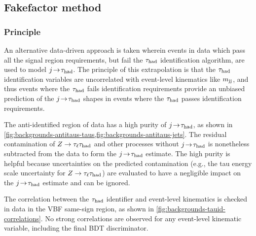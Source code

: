 \subsection{Fakefactor method}

\subsubsection{Principle}

An alternative data-driven approach is taken wherein events in data which pass all the signal region requirements, but fail the $\tau_\text{had}$ identification algorithm, are used to model $j\!\rightarrow\!\tau_\text{had}$. The principle of this extrapolation is that the $\tau_\text{had}$ identification variables are uncorrelated with event-level kinematics like $m_{\text{jj}}$, and thus events where the $\tau_\text{had}$ fails identification requirements provide an unbiased prediction of the $j\!\rightarrow\!\tau_\text{had}$ shapes in events where the $\tau_\text{had}$ passes identification requirements.

The anti-identified region of data has a high purity of $j\!\rightarrow\!\tau_\text{had}$, as shown in \cref{fig:backgrounds-antitaus-taus,fig:backgrounds-antitaus-jets}. The residual contamination of $Z\rightarrow\tau_\ell\tau_\text{had}$ and other processes without $j\!\rightarrow\!\tau_\text{had}$ is nonetheless subtracted from the data to form the $j\!\rightarrow\!\tau_\text{had}$ estimate. The high purity is helpful because uncertainties on the predicted contamination (e.g., the tau energy scale uncertainty for $Z\rightarrow\tau_\ell\tau_\text{had}$) are evaluated to have a negligible impact on the $j\!\rightarrow\!\tau_\text{had}$ estimate and can be ignored.

The correlation between the $\tau_\text{had}$ identifier and event-level kinematics is checked in data in the VBF same-sign region, as shown in \cref{fig:backgrounds-tauid-correlations}. No strong correlations are observed for any event-level kinematic variable, including the final BDT discriminator.

\clearpage

